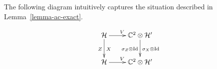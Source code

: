 The following diagram intuitively captures the situation described in Lemma~\ref{lemma-ac-exact}. 

\begin{equation}
\label{diagram-one-qubit-b}
\xymatrix{
\mH \ar[r]^{V} \ar[d]_{Z}^X & \C^2\otimes \mH' \ar[d]^{\sigma_X\otimes\Id}_{\sigma_Z\otimes \Id} \\
\mH \ar[r]^{V} &\C^2 \otimes \mH' }
\end{equation}


